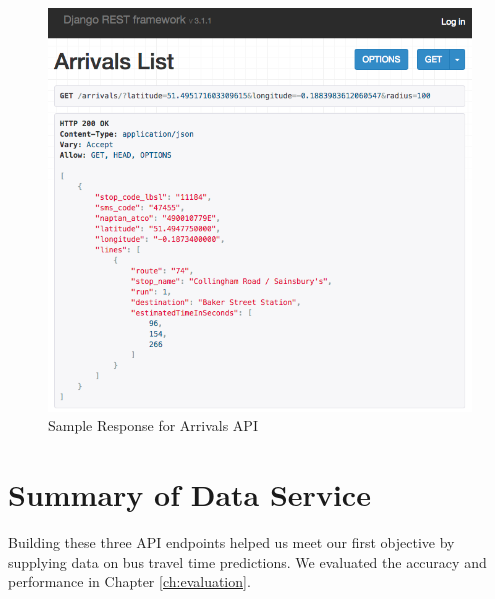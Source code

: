 \begin{figure}
\centering
\includegraphics[width=\textwidth]{figures/arrival_api.png}
\caption{\label{fig:arrival_api} Sample Response for Arrivals API}
\end{figure}

\section{Summary of Data Service}
Building these three API endpoints helped us meet our first objective by supplying data on bus travel time predictions. We evaluated the accuracy and performance in Chapter \ref{ch:evaluation}.
